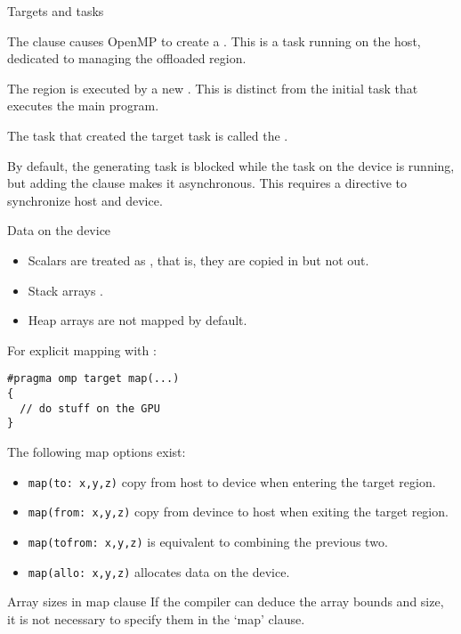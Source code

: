  {Targets and tasks}

The  clause causes OpenMP to create a
.
This is a task running on the host, dedicated to managing the
offloaded region.

The  region is executed
by a new .
This is distinct from the initial task that executes the main program.

The task that created the target task is called the
.

By default, the generating task is blocked while the task on the device is running,
but adding the  clause makes it asynchronous.
This requires a  directive to synchronize host and device.

 {Data on the device}

\begin{itemize}
\item Scalars are treated as , that is,
  they are copied in but not out.
\item Stack arrays .
\item Heap arrays are not mapped by default.
\end{itemize}

For explicit mapping with :
\begin{lstlisting}[language=omp]
#pragma omp target map(...)
{
  // do stuff on the GPU
}
\end{lstlisting}
The following map options exist:
\begin{itemize}
\item \lstinline+map(to: x,y,z)+ copy from host to device
  when entering the target region.
\item \lstinline+map(from: x,y,z)+ copy from devince to host
  when exiting the target region.
\item \lstinline+map(tofrom: x,y,z)+ is equivalent to combining the previous two.
\item \lstinline+map(allo: x,y,z)+ allocates data on the device.
\end{itemize}

\begin{fortrannote}{Array sizes in map clause}
  If the compiler can deduce the array bounds and size,
  it is not necessary to specify them in the `map' clause.
\end{fortrannote}

